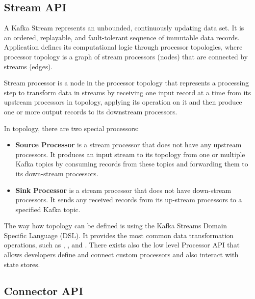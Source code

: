 


\subsection{Stream API \label{frameworks:kafka:streams}}

A Kafka Stream represents an unbounded, continuously updating data set.
It is an ordered, replayable, and fault-tolerant sequence of immutable data records.
Application defines its computational logic through processor topologies,
where processor topology is a graph of stream processors (nodes) that are
connected by streams (edges).

Stream processor is a node in the processor topology that represents
a processing step to transform data in streams by receiving one
input record at a time from its upstream processors in topology,
applying its operation on it and then produce one or more
output records to its downstream processors.

In topology, there are two special processors:

\begin{itemize}
  \item \textbf{Source Processor} is a stream processor
    that does not have any upstream processors. It produces an input stream
    to its topology from one or multiple Kafka topics by consuming records
    from these topics and forwarding them to its down-stream processors.
  \item \textbf{Sink Processor} is a stream processor
    that does not have down-stream processors. It sends any received records
    from its up-stream processors to a specified Kafka topic.
\end{itemize}

The way how topology can be defined is using the Kafka Streams Domain Specific Language (DSL).
It provides the most common data transformation operations, such as
, ,  and .
There exists also the low level Processor API that allows developers define
and connect custom processors and also interact with state stores.




\subsection{Connector API \label{frameworks:kafka:connector}}

